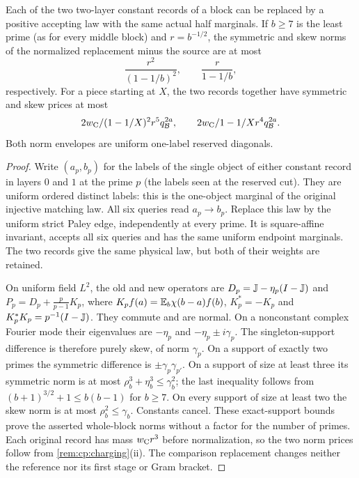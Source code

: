 \begin{lemma}\label{lem:record:accepting-c2}
Each of the two two-layer constant records of a block can be replaced
by a positive accepting law with the same actual half marginals. If
$b\ge7$ is the least prime (as for every middle block) and $r=b^{-1/2}$,
the symmetric and skew norms of
the normalized replacement minus the source are at most
\[
 \frac{r^2}{(1-1/b)^2},\qquad \frac r{1-1/b},
\]
respectively. For a piece starting at $X$, the two records together have
symmetric and skew prices at most
\[
 2w_{\rm C}/(1-1/X)^2r^5q_\mathcal B^{2a},\qquad
 2w_{\rm C}/1-1/Xr^4q_\mathcal B^{2a}.
\]
Both norm envelopes are uniform one-label reserved diagonals.
\end{lemma}

\begin{proof}
Write $(a_p,b_p)$ for the labels of the single object of either
constant record in layers $0$ and $1$ at the prime $p$ (the labels
seen at the reserved cut). They are uniform
ordered distinct labels: this is the one-object marginal of the original
injective matching law. All six queries read $a_p\to b_p$. Replace this
law by the uniform strict Paley edge, independently at every prime.
It is square-affine invariant, accepts all six queries and has the same
uniform endpoint marginals. The two records give the same physical law,
but both of their weights are retained.

On uniform field $L^2$, the old and new operators are
$D_p=\mathbb J-\eta_p(I-\mathbb J)$ and
$P_p=D_p+\frac p{p-1}K_p$, where
$K_pf(a)=\mathbb E_b\chi(b-a)f(b)$, $K_p^*=-K_p$ and
$K_p^*K_p=p^{-1}(I-\mathbb J)$. They commute and are normal. On a
nonconstant complex Fourier mode their eigenvalues are $-\eta_p$ and
$-\eta_p\pm i\gamma_p$. The singleton-support difference is therefore
purely skew, of norm $\gamma_p$. On a support of exactly two primes the
symmetric difference is $\pm\gamma_p\gamma_{p'}$. On a support of size
at least three its symmetric norm is at most
$\rho_b^3+\eta_b^3\le\gamma_b^2$; the last inequality follows from
$(b+1)^{3/2}+1\le b(b-1)$ for $b\ge7$.
On every support of size at least two the skew norm is at most
$\rho_b^2\le\gamma_b$. Constants cancel. These exact-support bounds
prove the asserted whole-block norms without a factor for the number
of primes. Each original record has mass $w_{\rm C}r^3$ before normalization,
so the two norm prices follow from \cref{rem:cp:charging}(ii).
The comparison replacement changes neither the reference nor its first
stage or Gram bracket.
\end{proof}

